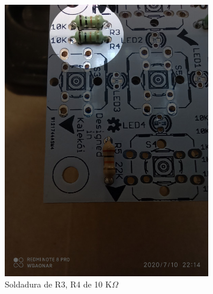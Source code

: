 \documentclass{article}
\begin{document}
\begin{figure}[htbp]
    \begin{subfigure}[t]{0.3\textwidth}
        \centering
        \includegraphics[width=0.9\columnwidth, height=1.2\columnwidth]{images/Botonera/botonera4.jpg}
        \caption{Soldadura de R3, R4 de 10 K$\Omega$}
        \label{fig:botonera_resistencias4}
    \end{subfigure}%
    \begin{subfigure}[t]{0.3\textwidth}
        \centering

\end{subfigure}
\end{figure}
\end{document}
